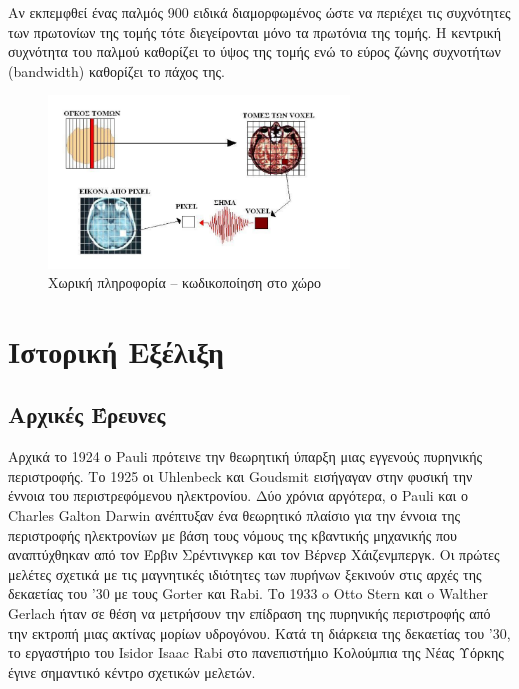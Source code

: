\documentclass{article}
\begin{document}
Αν	εκπεμφθεί	ένας	παλμός	900	ειδικά	διαμορφωμένος	ώστε	να	
περιέχει	 τις	 συχνότητες	 των	 πρωτονίων	 της	 τομής	 	 τότε	
διεγείρονται	 μόνο	 τα	 πρωτόνια	 της	 τομής.	 Η	 κεντρική	
συχνότητα	 του	 παλμού	 καθορίζει	 το	 ύψος	 της	 τομής	 ενώ	 το	
εύρος	ζώνης	συχνοτήτων	(bandwidth)	καθορίζει	το	πάχος	της.		\\
\begin{figure}[h!]	
     \centering
  \includegraphics[width=80mm,scale=2]{end.png}
  \caption{Χωρική	πληροφορία	–	κωδικοποίηση	στο	χώρο}
\end{figure}
\clearpage











\section{Ιστορική Εξέλιξη}
\subsection{Αρχικές Έρευνες}
Αρχικά το 1924 ο Pauli πρότεινε την θεωρητική
ύπαρξη μιας εγγενούς πυρηνικής περιστροφής. Το 1925 οι Uhlenbeck και Goudsmit
εισήγαγαν στην φυσική την έννοια του περιστρεφόμενου ηλεκτρονίου. Δύο χρόνια αργότερα,
ο Pauli και ο Charles Galton Darwin ανέπτυξαν ένα θεωρητικό πλαίσιο για την έννοια της
περιστροφής ηλεκτρονίων με βάση τους νόμους της κβαντικής μηχανικής που αναπτύχθηκαν
από τον Έρβιν Σρέντινγκερ και τον Βέρνερ Χάιζενμπεργκ.
Οι πρώτες μελέτες σχετικά με τις μαγνητικές ιδιότητες των πυρήνων ξεκινούν στις
αρχές της δεκαετίας του '30 με τους Gorter και Rabi. Το 1933 o Otto Stern και o Walther
Gerlach ήταν σε θέση να μετρήσουν την επίδραση της πυρηνικής περιστροφής από την
εκτροπή μιας ακτίνας μορίων υδρογόνου. Κατά τη διάρκεια της δεκαετίας του '30, το
εργαστήριο του Isidor Isaac Rabi στο πανεπιστήμιο Κολούμπια της Νέας Υόρκης έγινε
σημαντικό κέντρο σχετικών μελετών.
\end{document}
